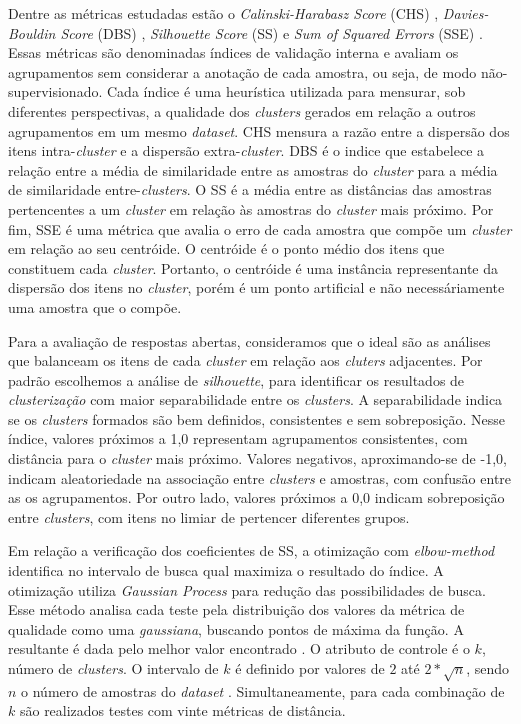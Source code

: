 Dentre as métricas estudadas estão o \textit{Calinski-Harabasz Score} (CHS) \cite{calinskiharabasz1974}, \textit{Davies-Bouldin Score} (DBS) \cite{daviesbouldin1979}, \textit{Silhouette Score} (SS) \cite{rousseeuw1987} e \textit{Sum of Squared Errors} (SSE) \cite{maimon2005}. Essas métricas são denominadas índices de validação interna e avaliam os agrupamentos sem considerar a anotação de cada amostra, ou seja, de modo não-supervisionado. Cada índice é uma heurística utilizada para mensurar, sob diferentes perspectivas, a qualidade dos \textit{clusters} gerados em relação a outros agrupamentos em um mesmo \textit{dataset}. CHS mensura a razão entre a dispersão dos itens intra-\textit{cluster} e a dispersão extra-\textit{cluster}. DBS é o indice que estabelece a relação entre a média de similaridade entre as amostras do \textit{cluster} para a média de similaridade entre-\textit{clusters}. O SS é a média entre as distâncias das amostras pertencentes a um \textit{cluster} em relação às amostras do \textit{cluster} mais próximo. Por fim, SSE é uma métrica que avalia o erro de cada amostra que compõe um \textit{cluster} em relação ao seu centróide. O centróide é o ponto médio dos itens que constituem cada \textit{cluster}. Portanto, o centróide é uma instância representante da dispersão dos itens no \textit{cluster}, porém é um ponto artificial e não necessáriamente uma amostra que o compõe.

Para a avaliação de respostas abertas, consideramos que o ideal são as análises que balanceam os itens de cada \textit{cluster} em relação aos \textit{cluters} adjacentes. Por padrão escolhemos a análise de \textit{silhouette}, para identificar os resultados de \textit{clusterização} com maior separabilidade entre os \textit{clusters}. A separabilidade indica se os \textit{clusters} formados são bem definidos, consistentes e sem sobreposição. Nesse índice, valores próximos a 1,0 representam agrupamentos consistentes, com distância para o \textit{cluster} mais próximo. Valores negativos, aproximando-se de -1,0, indicam aleatoriedade na associação entre \textit{clusters} e amostras, com confusão entre as os agrupamentos. Por outro lado, valores próximos a 0,0 indicam sobreposição entre \textit{clusters}, com itens no limiar de pertencer diferentes grupos. 

Em relação a verificação dos coeficientes de SS, a otimização com \textit{elbow-method} identifica no intervalo de busca qual maximiza o resultado do índice. A otimização utiliza \textit{Gaussian Process} para redução das possibilidades de busca. Esse método analisa cada teste pela distribuição dos valores da métrica de qualidade como uma \textit{gaussiana}, buscando pontos de máxima da função. A resultante é dada pelo melhor valor encontrado \cite{spalenza2019}. O atributo de controle é o $ k $, número de \textit{clusters}. O intervalo de $ k $ é definido por valores de $ 2 $ até $ 2 * \sqrt{n} $, sendo $ n $ o número de amostras do \textit{dataset} \cite{han2011}. Simultaneamente, para cada combinação de $ k $ são realizados testes com vinte métricas de distância.

